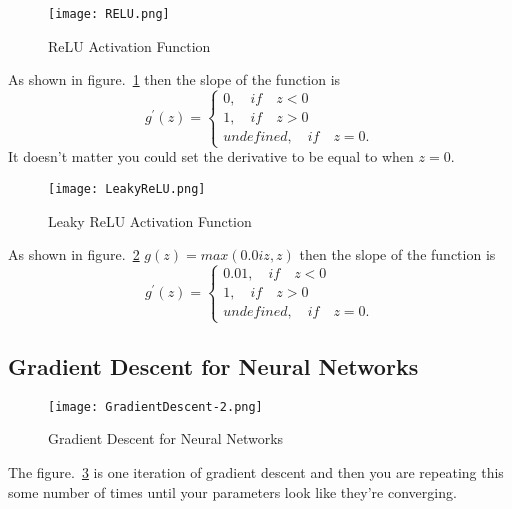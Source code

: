 \documentclass[a4paper]{article}
\begin{document}
\begin{figure}[!htp]
\begin{center}
   \texttt{[image: RELU.png]}
\end{center}
   \caption{ReLU Activation Function~\cite{mooc.com,Coursera.org}}
\label{fig:ReLU-1}
\end{figure}

As shown in figure.~\ref{fig:ReLU-1} then the slope of the function is
\begin{equation}
g^{'}(z)=
\begin{cases}
0,\quad if \quad z<0\\
1,\quad if \quad z>0\\
undefined,\quad if \quad z=0.
\end{cases}
\end{equation}
It doesn't matter you could set the derivative to be equal to when $z=0$.

\begin{figure}[!htp]
\begin{center}
   \texttt{[image: LeakyReLU.png]}
\end{center}
   \caption{Leaky ReLU Activation Function~\cite{mooc.com,Coursera.org}}
\label{fig:LeakyReLU}
\end{figure}

As shown in figure.~\ref{fig:LeakyReLU}  $g(z)=max(0.0iz,z)$ then the slope of the function is
\begin{equation}
g^{'}(z)=
\begin{cases}
0.01,\quad if \quad z<0\\
1,\quad if \quad z>0\\
undefined,\quad if \quad z=0.
\end{cases}
\end{equation}


\subsection{Gradient Descent for Neural Networks}

\begin{figure}[!htp]
\begin{center}
   \texttt{[image: GradientDescent-2.png]}
\end{center}
   \caption{Gradient Descent for Neural Networks~\cite{mooc.com,Coursera.org}}
\label{fig:GD-2}
\end{figure}

The figure.~\ref{fig:GD-2} is one iteration of gradient descent and then you are repeating this some number of times until your parameters look like they're converging.
\end{document}

